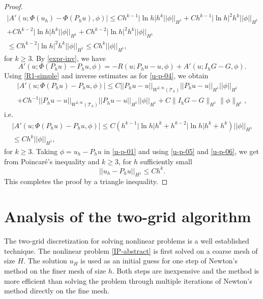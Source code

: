 \documentclass[12pt]{amsart}
\numberwithin{equation}{section}
\begin{document}
\begin{proof}
\begin{multline} \label{u-p-05}
| A'(u; \Phi(u_h) - \Phi(P_h u),\phi)| \leq  C h^{k-1} | \ln h|   h^k ||\phi||_{H^1}  + C h^{k-1} | \ln h|^2   h^k ||\phi||_{H^1} \\
 + C h^{k-2} | \ln h| h^k ||\phi||_{H^1} + C h^{k-2} | \ln h|^2 h^k ||\phi||_{H^1}\\
 \leq C h^{k-2} | \ln h|^2 h^k ||\phi||_{H^1} \leq C h^k ||\phi||_{H^1},
\end{multline}
for $k \geq 3$. By \eqref{expr-inv}, we have
$$
 A'(u; \Phi(P_h u) - P_h u,\phi) = -R(u;P_h u-u,\phi) + A'(u;I_h G - G, \phi).
$$
Using \eqref{R1-simple} and inverse estimates as for \eqref{u-p-04}, we obtain
\begin{multline*} 
| A'(u; \Phi(P_h u) - P_h u,\phi) | \leq C ||P_h u - u ||_{W^{2,\infty}(\mathcal{T}_h)} ||P_h u - u ||_{H^{1}}  ||\phi||_{H^1} \\
+ C  h^{-1} ||P_h u - u ||_{W^{2,\infty}(\mathcal{T}_h)}  || P_h u - u ||_{H^{1}} ||\phi||_{H^1} 
+C\|I_hG-G\|_{H^1}\|\phi\|_{H^1},
\end{multline*}
i.e.
\begin{multline} \label{u-p-06}
| A'(u; \Phi(P_h u) - P_h u,\phi) | \leq C ( h^{k-1} |\ln h| h^k + h^{k-2} |\ln h| h^k + h^k ) ||\phi||_{H^1} \\ \leq C h^k ||\phi||_{H^1}, 
\end{multline}
for $k \geq 3$. Taking $\phi = u_h - P_h u $ in \eqref{u-p-01} and using \eqref{u-p-05} and \eqref{u-p-06}, we get from Poincar\'e's inequality
and $k \geq 3$, for $h$ sufficiently small
$$
 ||  u_h - P_h u  ||_{H^{1}} \leq Ch^k.
$$
This completes the proof by a triangle inequality.

\end{proof}


\section{Analysis of the two-grid algorithm} \label{two-grid-section}


The two-grid discretization for solving nonlinear problems is a well established technique. The nonlinear problem \eqref{IP-abstract} is first solved on a coarse mesh of size $H$. 
The solution $u_H$ is used as an initial guess for one step of Newton's method on the finer mesh of size $h$. 
Both steps are inexpensive and the method is more efficient than solving the problem through multiple iterations of Newton's method directly on the fine mesh. %
\end{document}
